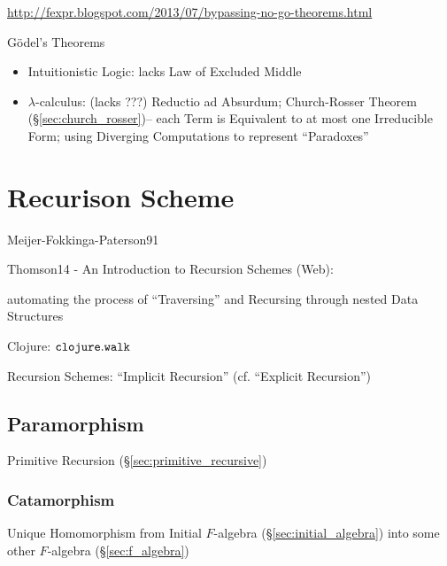 \url{http://fexpr.blogspot.com/2013/07/bypassing-no-go-theorems.html}

G\"odel's Theorems

\begin{itemize}
\item Intuitionistic Logic: lacks Law of Excluded Middle
\item $\lambda$-calculus: (lacks ???) Reductio ad Absurdum;
  Church-Rosser Theorem (\S\ref{sec:church_rosser})-- each Term is
  Equivalent to at most one Irreducible Form; using
  Diverging Computations to represent ``Paradoxes''
\end{itemize}



\section{Recurison Scheme}\label{sec:recursion_scheme}

Meijer-Fokkinga-Paterson91 %

Thomson14 - An Introduction to Recursion Schemes (Web): %

automating the process of ``Traversing'' and Recursing through nested
Data Structures

Clojure: $\mathtt{clojure.walk}$

Recursion Schemes: ``Implicit Recursion'' (cf. ``Explicit Recursion'')



\subsection{Paramorphism}\label{sec:paramorphism}

Primitive Recursion (\S\ref{sec:primitive_recursive})



\subsubsection{Catamorphism}\label{sec:catamorphism}

Unique Homomorphism from Initial $F$-algebra
(\S\ref{sec:initial_algebra}) into some other $F$-algebra
(\S\ref{sec:f_algebra})


